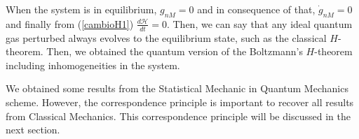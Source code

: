 When the system is in equilibrium, $g_{nM}=0$ and in consequence of that, $\dot
g_{nM}=0$ and finally from (\ref{cambioH1}) $\frac{d\mathcal{H}}{dt}=0$. Then, we can
say that any ideal quantum gas perturbed always evolves to the equilibrium
state, such as the classical $H$-theorem. Then, we obtained the quantum version
of the Boltzmann's $H$-theorem including inhomogeneities in the system.

We obtained some results from the Statistical Mechanic in Quantum Mechanics
scheme. However, the correspondence principle is important to recover all
results from Classical Mechanics. This correspondence principle will be
discussed in the next section.

 


